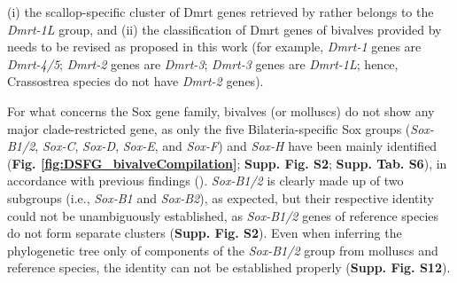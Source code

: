 \documentclass[../main.tex]{subfiles}
\begin{document}
(i) the scallop-specific cluster of Dmrt genes retrieved by \textbf{\cite{wang2023genome}} rather belongs to the \textit{Dmrt-1L} group, and (ii) the classification of Dmrt genes of bivalves provided by \textbf{\cite{zeng2024genome}} needs to be revised as proposed in this work (for example, \textit{Dmrt-1} genes are \textit{Dmrt-4/5}; \textit{Dmrt-2} genes are \textit{Dmrt-3}; \textit{Dmrt-3} genes are \textit{Dmrt-1L}; hence, Crassostrea species do not have \textit{Dmrt-2} genes).

For what concerns the Sox gene family, bivalves (or molluscs) do not show any major clade-restricted gene, as only the five Bilateria-specific Sox groups (\textit{Sox-B1/2}, \textit{Sox-C}, \textit{Sox-D}, \textit{Sox-E}, and \textit{Sox-F}) and \textit{Sox-H} have been mainly identified (\textbf{Fig. \ref{fig:DSFG_bivalveCompilation}}; \textbf{Supp. Fig. S2}; \textbf{Supp. Tab. S6}), in accordance with previous findings (\textbf{\cite{yu2017genome,evensen2022comparative,wang2024genome}}). \textit{Sox-B1/2} is clearly made up of two subgroups (i.e., \textit{Sox-B1} and \textit{Sox-B2}), as expected, but their respective identity could not be unambiguously established, as \textit{Sox-B1/2} genes of reference species do not form separate clusters (\textbf{Supp. Fig. S2}). Even when inferring the phylogenetic tree only of components of the \textit{Sox-B1/2} group from molluscs and reference species, the identity can not be established properly (\textbf{Supp. Fig. S12}).
\end{document}
